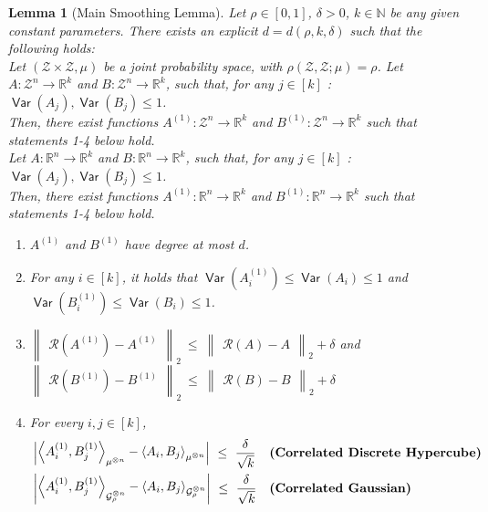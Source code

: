 \documentclass[11pt]{article}
\newcommand{\inangle}[1]{\left \langle #1 \right \rangle}
\newcommand{\inabs}[1]{\begin{vmatrix} #1 \end{vmatrix}}
\newcommand{\norm}[2]{\begin{Vmatrix} #2 \end{Vmatrix}_{#1}}
\DeclareMathOperator*{\Var}{\mathsf{Var}}
\newcommand{\bbN}{{\mathbb N}}
\newcommand{\bbR}{{\mathbb R}}
\newcommand{\calG}{\mathcal{G}}
\newcommand{\calR}{\mathcal{R}}
\newcommand{\calZ}{\mathcal{Z}}
\newtheorem{lem}[theorem]{Lemma}
\begin{document}

\begin{lem}[Main Smoothing Lemma] \label{lem:smoothing_main}
	Let $\rho \in [0,1]$, $\delta > 0$, $k \in \bbN$ be any given constant parameters. There exists an explicit $d = d(\rho, k, \delta)$ such that the following holds:\\
	
	 Let $(\calZ \times \calZ, \mu)$ be a joint probability space, with $\rho(\calZ, \calZ; \mu) = \rho$. Let $A : \calZ^n \to \bbR^k$ and $B : \calZ^n \to \bbR^k$, such that, for any $j \in [k]$ : $\Var(A_j), \Var(B_j) \le 1$.\\
	Then, there exist functions $A^{(1)} : \calZ^n \to \bbR^k$ and $B^{(1)} : \calZ^n \to \bbR^k$ such that statements 1-4 below hold.\\
	
	 Let $A : \bbR^n \to \bbR^k$ and $B : \bbR^n \to \bbR^k$, such that, for any $j \in [k]$ : $\Var(A_j), \Var(B_j) \le 1$.\\
	Then, there exist functions $A^{(1)} : \bbR^n \to \bbR^k$ and $B^{(1)} : \bbR^n \to \bbR^k$ such that statements 1-4 below hold.

	\begin{enumerate}
	\item $A^{(1)}$ and $B^{(1)}$ have degree at most $d$.
	\item For any $i \in [k]$, it holds that $\Var(A^{(1)}_i) \le \Var(A_i) \le 1$ and $\Var(B^{(1)}_i) \le \Var(B_i) \le 1$.
	\item $\norm{2}{\calR(A^{(1)}) - A^{(1)}} ~\le~ \norm{2}{\calR(A) - A} + \delta$ and $\norm{2}{\calR(B^{(1)}) - B^{(1)}} ~\le~ \norm{2}{\calR(B) - B} + \delta$
	\item For every $i, j \in [k]$,
	\begin{align*}
		& \inabs{\inangle{A^{(1)}_i, B^{(1)}_j}_{\mu^{\otimes n}} - \inangle{A_i, B_j}_{\mu^{\otimes n}}} ~\le~ \frac{\delta}{\sqrt{k}} && \text{\bf (Correlated Discrete Hypercube)} \\
		& \inabs{\inangle{A^{(1)}_i, B^{(1)}_j}_{\calG_\rho^{\otimes n}} - \inangle{A_i, B_j}_{\calG_\rho^{\otimes n}}} ~\le~ \frac{\delta}{\sqrt{k}} && \text{\bf (Correlated Gaussian)}
	\end{align*}
	\end{enumerate}


\end{lem}
\end{document}
